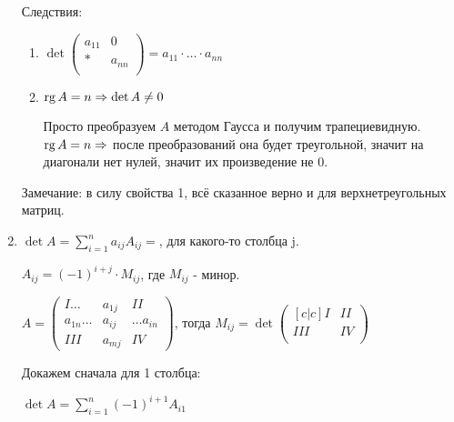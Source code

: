\begin{enumerate}
          Следствия:
          \begin{enumerate}
              \item \(\det\begin{pmatrix}
                        a_{11} & 0      \\
                        *      & a_{nn} \\
                    \end{pmatrix} = a_{11} \cdot \ldots \cdot a_{nn}\)\\
              \item  \(\operatorname{rg}{A} = n \Rightarrow \det A \neq 0\)

                    Просто преобразуем \(A\) методом Гаусса и получим трапециевидную. \(\operatorname{rg}{A} = n \Rightarrow\) после преобразований она будет треугольной, значит на диагонали нет нулей, значит их произведение не 0.
          \end{enumerate}

          Замечание: в силу свойства 1, всё сказанное верно и для верхнетреугольных матриц.

    \item \(\det A = \sum\limits_{i=1}^n a_{ij} A_{ij} = \), для какого-то столбца j.

          \( A_{ij} = ({-1})^{i+j} \cdot M_{ij}\), где \(M_{ij}\) - минор.

          \(A=\begin{pmatrix}
              I \ldots      & a_{1j} & II             \\
              a_{1n} \ldots & a_{ij} & \ldots  a_{in} \\
              III           & a_{mj} & IV
          \end{pmatrix}\), тогда \(M_{ij} = \det
          \begin{pmatrix}[c|c]
              I   & II \\
              \hline
              III & IV \\
          \end{pmatrix}\)

          Докажем сначала для 1 столбца:

          \(\det A = \sum\limits_{i = 1}^n (-1)^{i+1} A_{i1}\)


\end{enumerate}
